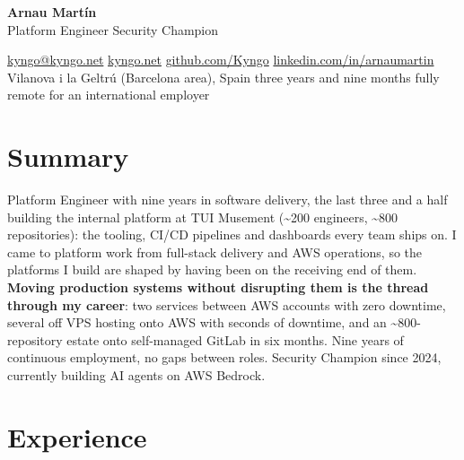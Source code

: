 \documentclass[10pt,a4paper]{article}
\newif\ifshowbirthdate  \showbirthdatefalse   %
\begin{document}
\begin{minipage}[t]{\linewidth}
  \vspace{0pt}
  {\Huge\textbf{Arnau Martín}}\\[0.26em]
  {\large\color{accent}Platform Engineer \textcolor{muted}{\textbar} Security Champion}\\[0.5em]
  {\small\raggedright   %
  \href{mailto:kyngo@kyngo.net}{kyngo@kyngo.net} \textcolor{muted}{\textbullet}
  \href{https://kyngo.net}{kyngo.net} \textcolor{muted}{\textbullet}
  \href{https://github.com/Kyngo}{github.com/Kyngo} \textcolor{muted}{\textbullet}
  \href{https://linkedin.com/in/arnaumartin}{linkedin.com/in/arnaumartin}\\[0.18em]
  \textcolor{muted}{Vilanova i la Geltrú (Barcelona area), Spain \textbullet{} three years and
  nine months fully remote for an international employer}%
  \ifshowbirthdate\textcolor{muted}{ \textbullet{} Born July 21, 1995}\fi
  }
\end{minipage}%

\section*{Summary}
Platform Engineer with nine years in software delivery, the last three and a half building the
internal platform at TUI Musement (\textasciitilde200 engineers, \textasciitilde800
repositories): the tooling, CI/CD pipelines and dashboards every team ships on. I came to
platform work from full-stack delivery and AWS operations, so the platforms I build are shaped
by having been on the receiving end of them. \textbf{Moving production systems without
disrupting them is the thread through my career}: two services between AWS accounts with zero
downtime, several off VPS hosting onto AWS with seconds of downtime, and an
\textasciitilde800-repository estate onto self-managed GitLab in six months. Nine years of
continuous employment, no gaps between roles. Security Champion since 2024, currently building
AI agents on AWS Bedrock.

\section*{Experience}
\end{document}
